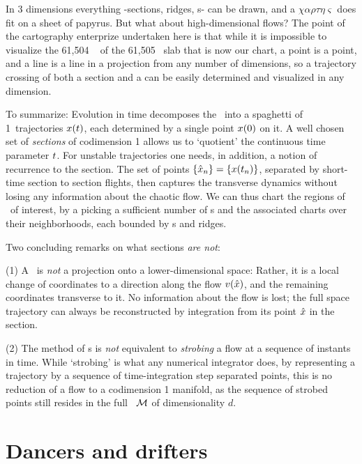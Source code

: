 \documentclass[aip,cha,reprint,
secnumarabic,
nofootinbib, tightenlines,
nobibnotes, showkeys, showpacs,
groupedaddress
]{revtex4-1}
\begin{document}
In 3 dimensions everything -sections, ridges, \poincBord s- can be
drawn, and a $\chi\alpha\rho\tau\eta\varsigma$ does fit on a sheet of
papyrus. But what about high-dimensional flows? The point of the
cartography enterprize undertaken here is that while it is impossible to
visualize the 61,504%
\dmn\ {\poincBord} of the 61,505%
\dmn\ slab that is now our chart, a point is a point,
and a line is a line in a projection from any number of dimensions, so a
trajectory crossing of both a section and a {\poincBord} can be easily
determined and visualized in any dimension.

To summarize:
Evolution in time decomposes the \statesp\ into a spaghetti of 1\dmn\
trajectories $x(t)$, each determined by a single point $x(0)$
on it. A well chosen set of \emph{sections} of codimension 1 allows us to
`quotient' the continuous time parameter $t$. For unstable
trajectories one needs, in addition, a notion of recurrence to the
section. The set of points $\{\hat{x}_n\} = \{x(t_n)\}$,  separated
by short-time section to section flights, then captures the transverse
dynamics without losing any information about the chaotic flow.
We can thus chart the regions of \statesp\ of interest, by a picking a
sufficient number of \template s and the associated charts over their
neighborhoods, each bounded by \poincBord s and ridges.

Two concluding remarks on what sections \emph{are not}:

(1) A \PoincSec\ is {\em not} a projection onto a
lower-dimensional space: Rather, it is a local change of coordinates to a
direction along the flow $v(\hat{x})$, and the remaining coordinates
transverse to it. No information about the flow is lost; the full space
trajectory can always be reconstructed by integration from its point
$\hat{x}$ in the section.

(2) The method of \PoincSec s is {\em not} equivalent to
\emph{strobing} a flow at a sequence of instants in time. While
`strobing' is what any numerical integrator does, by representing a
trajectory by a sequence of time-integration step separated points, this
is no reduction of a flow to a codimension 1 manifold, as the sequence of
strobed points still resides in the full \statesp\ ${\cal M}$ of
dimensionality $d$.


\section{Dancers and drifters}
\label{s:symm}
\end{document}
